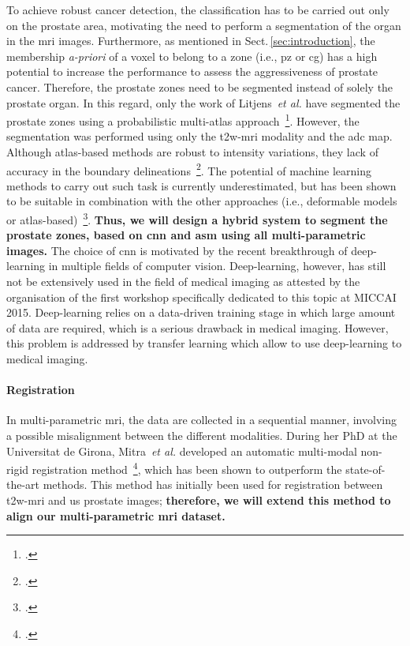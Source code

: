 To achieve robust cancer detection, the classification has to be carried out only on the prostate area, motivating the need to perform a segmentation of the organ in the \ac{mri} images.
Furthermore, as mentioned in Sect.\,\ref{sec:introduction}, the membership \emph{a-priori} of a voxel to belong to a zone (i.e., \ac{pz} or \ac{cg}) has a high potential to increase the performance to assess the aggressiveness of prostate cancer.
Therefore, the prostate zones need to be segmented instead of solely the prostate organ.
In this regard, only the work of Litjens~\emph{et al.} have segmented the prostate zones using a probabilistic multi-atlas approach~\footcite{Litjens2014}.
However, the segmentation was performed using only the \ac{t2w}-\ac{mri} modality and the \ac{adc} map.
Although atlas-based methods are robust to intensity variations, they lack of accuracy in the boundary delineations~\footcite{Ghose2012}.
The potential of machine learning methods to carry out such task is currently underestimated, but has been shown to be suitable in combination with the other approaches (i.e., deformable models or atlas-based)~\footcite{ghose2012graph}.
\textbf{Thus, we will design a hybrid system to segment the prostate zones, based on \ac{cnn} and \ac{asm} using all multi-parametric images.}
The choice of \ac{cnn} is motivated by the recent breakthrough of deep-learning in multiple fields of computer vision.
Deep-learning, however, has still not be extensively used in the field of medical imaging as attested by the organisation of the first workshop specifically dedicated to this topic at MICCAI 2015. 
Deep-learning relies on a data-driven training stage in which large amount of data are required, which is a serious drawback in medical imaging.
However, this problem is addressed by transfer learning which allow to use deep-learning to medical imaging.

\paragraph{Registration}

In multi-parametric \ac{mri}, the data are collected in a sequential manner, involving a possible misalignment between the different modalities.
During her PhD at the Universitat de Girona, Mitra~\emph{et al.} developed an automatic multi-modal non-rigid registration method~\footcite{Mitra2012a}, which has been shown to outperform the state-of-the-art methods.
This method has initially been used for registration between \ac{t2w}-\ac{mri} and \ac{us} prostate images; \textbf{therefore, we will extend this method to align our multi-parametric \ac{mri} dataset.}

